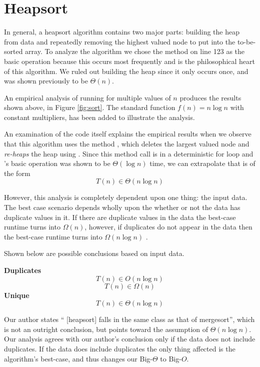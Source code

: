\documentclass[11pt]{article}
\begin{document}
\section{Heapsort}

In general, a heapsort algorithm contains two major parts: building the heap from data and repeatedly removing the highest valued node to put into the to-be-sorted array.
%
To analyze the  algorithm we chose the  method  on line 123 as the basic operation because this occurs most frequently and is the philosophical heart of this algorithm. We ruled out building the heap since it only occurs once, and was shown previously to be $\Theta(n)$.

\begin{center}
    
        \label{fig:sort}
\end{center}

An empirical analysis of running  for multiple values of $n$ produces the results shown above, in Figure \ref{fig:sort}. The standard function $f(n) = n \log n$ with constant multipliers, has been added to illustrate the analysis.

An examination of the code itself explains the empirical results when we observe that this algorithm uses the method , which deletes the largest valued node and \textit{re-heaps} the heap using . Since this method call is in a deterministic for loop and 's basic operation was shown to be $\Theta(\log n)$ time, we can extrapolate that  is of the form
\[
	T(n)\in \Theta(n\log n)
\]

However, this analysis is completely dependent upon one thing: the input data. The best case scenario depends wholly upon the whether or not the data has duplicate values in it. If there are duplicate values in the data the best-case runtime turns into $\Omega(n)$, however, if duplicates do not appear in the data then the best-case runtime turns into $\Omega(n\log n)$ \cite[84--86]{anal}.

Shown below are possible conclusions based on input data.

\textbf{Duplicates}
\[
	T(n)\in O(n\log n)
	\]
	\[
	T(n)\in \Omega(n)
	\]
\textbf{Unique}
\[
	T(n)\in \Theta(n\log n)
\]

Our author states `` [heapsort] falls in the same class as that of mergesort'', which is not an outright conclusion, but points toward the assumption of $\Theta(n \log n)$. Our analysis agrees with our author's conclusion only if the data does not include duplicates. If the data does include duplicates the only thing affected is the algorithm's best-case, and thus changes our Big-$\Theta$ to Big-$O$.
\nocite{*}
\clearpage
\printbibliography
\end{document}
